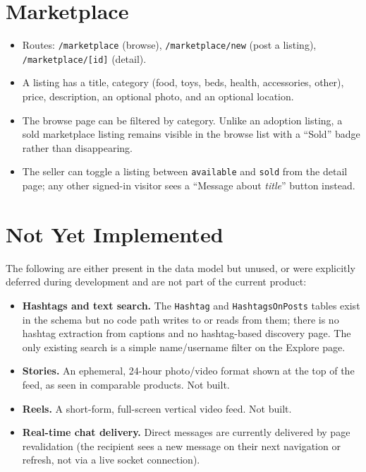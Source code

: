 \documentclass[11pt,a4paper]{article}
\begin{document}
\section{Marketplace}
\begin{itemize}[leftmargin=*]
  \item Routes: \texttt{/marketplace} (browse), \texttt{/marketplace/new} (post a
        listing), \texttt{/marketplace/[id]} (detail).
  \item A listing has a title, category (food, toys, beds, health, accessories, other),
        price, description, an optional photo, and an optional location.
  \item The browse page can be filtered by category. Unlike an adoption listing, a sold
        marketplace listing remains visible in the browse list with a ``Sold'' badge
        rather than disappearing.
  \item The seller can toggle a listing between \texttt{available} and \texttt{sold}
        from the detail page; any other signed-in visitor sees a ``Message about
        \emph{title}'' button instead.
\end{itemize}

\section{Not Yet Implemented}
The following are either present in the data model but unused, or were explicitly
deferred during development and are not part of the current product:

\begin{itemize}[leftmargin=*]
  \item \textbf{Hashtags and text search.} The \texttt{Hashtag} and
        \texttt{HashtagsOnPosts} tables exist in the schema but no code path writes to
        or reads from them; there is no hashtag extraction from captions and no
        hashtag-based discovery page. The only existing search is a simple
        name/username filter on the Explore page.
  \item \textbf{Stories.} An ephemeral, 24-hour photo/video format shown at the top of
        the feed, as seen in comparable products. Not built.
  \item \textbf{Reels.} A short-form, full-screen vertical video feed. Not built.
  \item \textbf{Real-time chat delivery.} Direct messages are currently delivered by
        page revalidation (the recipient sees a new message on their next navigation or
        refresh, not via a live socket connection).
\end{itemize}
\end{document}
